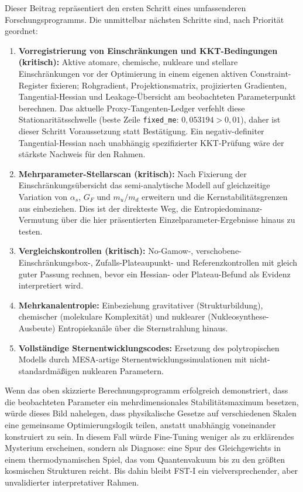 \documentclass[12pt,a4paper]{article}
\theoremstyle{remark}
\begin{document}
Dieser Beitrag repr\"asentiert den ersten Schritt eines umfassenderen Forschungsprogramms. Die unmittelbar n\"achsten Schritte sind, nach Priorit\"at geordnet:
\begin{enumerate}
    \item \textbf{Vorregistrierung von Einschr\"ankungen und KKT-Bedingungen (kritisch):} Aktive atomare, chemische, nukleare und stellare Einschr\"ankungen vor der Optimierung in einem eigenen aktiven Constraint-Register fixieren; Rohgradient, Projektionsmatrix, projizierten Gradienten, Tangential-Hessian und Leakage-\"Ubersicht am beobachteten Parameterpunkt berechnen. Das aktuelle Proxy-Tangenten-Ledger verfehlt diese Stationarit\"atsschwelle (beste Zeile \texttt{fixed\_me}: $0{,}053194>0{,}01$), daher ist dieser Schritt Voraussetzung statt Best\"atigung. Ein negativ-definiter Tangential-Hessian nach unabh\"angig spezifizierter KKT-Pr\"ufung w\"are der st\"arkste Nachweis f\"ur den Rahmen.
    \item \textbf{Mehrparameter-Stellarscan (kritisch):} Nach Fixierung der Einschr\"ankungs\"ubersicht das semi-analytische Modell auf gleichzeitige Variation von $\alpha_s$, $G_F$ und $m_u/m_d$ erweitern und die Kernstabilit\"atsgrenzen aus \citep{Adams2019} einbeziehen. Dies ist der direkteste Weg, die Entropiedominanz-Vermutung \"uber die hier pr\"asentierten Einzelparameter-Ergebnisse hinaus zu testen.
    \item \textbf{Vergleichskontrollen (kritisch):} No-Gamow-, verschobene-Einschr\"ankungsbox-, Zufalls-Plateaupunkt- und Referenzkontrollen mit gleich guter Passung rechnen, bevor ein Hessian- oder Plateau-Befund als Evidenz interpretiert wird.
    \item \textbf{Mehrkanalentropie:} Einbeziehung gravitativer (Strukturbildung), chemischer (molekulare Komplexit\"at) und nuklearer (Nukleosynthese-Ausbeute) Entropiekan\"ale \"uber die Sternstrahlung hinaus.
    \item \textbf{Vollst\"andige Sternentwicklungscodes:} Ersetzung des polytropischen Modells durch MESA-artige Sternentwicklungssimulationen mit nicht-standardm\"a\ss{}igen nuklearen Parametern.
\end{enumerate}

Wenn das oben skizzierte Berechnungsprogramm erfolgreich demonstriert, dass die beobachteten Parameter ein mehrdimensionales Stabilit\"atsmaximum besetzen, w\"urde dieses Bild nahelegen, dass physikalische Gesetze auf verschiedenen Skalen eine gemeinsame Optimierungslogik teilen, anstatt unabh\"angig voneinander konstruiert zu sein. In diesem Fall w\"urde Fine-Tuning weniger als zu erkl\"arendes Mysterium erscheinen, sondern als Diagnose: eine Spur des Gleichgewichts in einem thermodynamischen Spiel, das vom Quantenvakuum bis zu den gr\"o\ss{}ten kosmischen Strukturen reicht. Bis dahin bleibt FST-I ein vielversprechender, aber unvalidierter interpretativer Rahmen.
\end{document}
